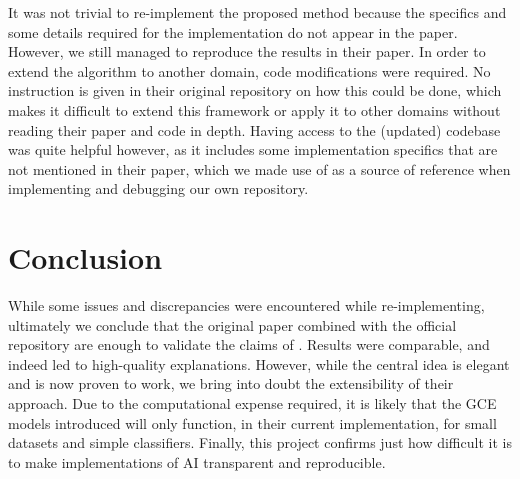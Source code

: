 It was not trivial to re-implement the proposed method because the specifics and some details required for the implementation do not appear in the paper. However, we still managed to reproduce the results in their paper. In order to extend the algorithm to another domain, code modifications were required. No instruction is given in their original repository on how this could be done, which makes it difficult to extend this framework or apply it to other domains without reading their paper and code in depth. Having access to the (updated) codebase was quite helpful however, as it includes some implementation specifics that are not mentioned in their paper, which we made use of as a source of reference when implementing and debugging our own repository.

\section{Conclusion}

While some issues and discrepancies were encountered while re-implementing, ultimately we conclude that the original paper combined with the official repository are enough to validate the claims of \cite{oshaughnessy2020generative}. Results were comparable, and indeed led to high-quality explanations. However, while the  central idea is elegant and is now proven to work, we bring into doubt the extensibility of their approach. Due to the computational expense required, it is likely that the GCE models introduced will only function, in their current implementation, for small datasets and simple classifiers. Finally, this project confirms just how difficult it is to make implementations of AI transparent and reproducible.